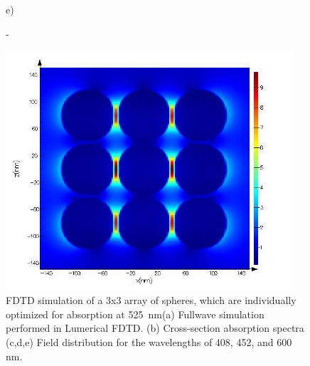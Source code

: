 \documentclass[a4paper]{article}
\begin{document}
\begin{figure}
\begin{minipage}[h]{0.49\textwidth}
  \end{minipage}
  \begin{minipage}[h]{0.49\textwidth}    \begin{flushleft}     e)    \end{flushleft}
  \end{minipage}
  \begin{minipage}[h]{0.49\textwidth}    \begin{flushleft}     -   \end{flushleft}
  \end{minipage}
  \begin{minipage}[h]{0.49\textwidth} 
    \includegraphics[width=0.95\textwidth]{fdtd-field-600nm}
  \end{minipage}
  
    \caption{ FDTD simulation of a 3x3 array of spheres, which are
      individually optimized for absorption at 525~nm(a) Fullwave
      simulation performed in Lumerical FDTD. (b) Cross-section
      absorption spectra (c,d,e) Field distribution for the
      wavelengths of 408, 452, and 600 nm.\label{fig:fdtd-3x3}}%
\end{figure}


\vspace{10pt}
\end{document}
